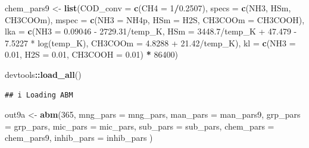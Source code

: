 \documentclass[
]{article}
\newenvironment{Shaded}{\begin{snugshade}}{\end{snugshade}}
\newcommand{\AttributeTok}[1]{\textcolor[rgb]{0.13,0.29,0.53}{#1}}
\newcommand{\DecValTok}[1]{\textcolor[rgb]{0.00,0.00,0.81}{#1}}
\newcommand{\FloatTok}[1]{\textcolor[rgb]{0.00,0.00,0.81}{#1}}
\newcommand{\FunctionTok}[1]{\textcolor[rgb]{0.13,0.29,0.53}{\textbf{#1}}}
\newcommand{\NormalTok}[1]{#1}
\newcommand{\OtherTok}[1]{\textcolor[rgb]{0.56,0.35,0.01}{#1}}
\newcommand{\SpecialCharTok}[1]{\textcolor[rgb]{0.81,0.36,0.00}{\textbf{#1}}}
\newcommand{\StringTok}[1]{\textcolor[rgb]{0.31,0.60,0.02}{#1}}
\begin{document}
\begin{Shaded}
\begin{Highlighting}[]
\NormalTok{chem\_pars9 }\OtherTok{\textless{}{-}} \FunctionTok{list}\NormalTok{(}\AttributeTok{COD\_conv =} \FunctionTok{c}\NormalTok{(}\AttributeTok{CH4 =} \DecValTok{1}\SpecialCharTok{/}\FloatTok{0.2507}\NormalTok{),}
                   \AttributeTok{specs =} \FunctionTok{c}\NormalTok{(}\StringTok{\textquotesingle{}NH3\textquotesingle{}}\NormalTok{, }\StringTok{\textquotesingle{}HSm\textquotesingle{}}\NormalTok{, }\StringTok{\textquotesingle{}CH3COOm\textquotesingle{}}\NormalTok{),}
                   \AttributeTok{mspec =} \FunctionTok{c}\NormalTok{(}\AttributeTok{NH3 =} \StringTok{\textquotesingle{}NH4p\textquotesingle{}}\NormalTok{, }\AttributeTok{HSm =} \StringTok{\textquotesingle{}H2S\textquotesingle{}}\NormalTok{, }\AttributeTok{CH3COOm =} \StringTok{\textquotesingle{}CH3COOH\textquotesingle{}}\NormalTok{),}
                   \AttributeTok{lka =} \FunctionTok{c}\NormalTok{(}\AttributeTok{NH3 =} \StringTok{\textquotesingle{}{-} 0.09046 {-} 2729.31/temp\_K\textquotesingle{}}\NormalTok{, }
                           \AttributeTok{HSm =} \StringTok{\textquotesingle{}{-} 3448.7/temp\_K + 47.479 {-} 7.5227 * log(temp\_K)\textquotesingle{}}\NormalTok{,}
                           \AttributeTok{CH3COOm =} \StringTok{\textquotesingle{}{-}4.8288 + 21.42/temp\_K\textquotesingle{}}\NormalTok{),}
                   \AttributeTok{kl =} \FunctionTok{c}\NormalTok{(}\AttributeTok{NH3 =} \FloatTok{0.01}\NormalTok{, }\AttributeTok{H2S =} \FloatTok{0.01}\NormalTok{, }\AttributeTok{CH3COOH =} \FloatTok{0.01}\NormalTok{) }\SpecialCharTok{*} \DecValTok{86400}\NormalTok{)}
\end{Highlighting}
\end{Shaded}

\begin{Shaded}
\begin{Highlighting}[]
\NormalTok{devtools}\SpecialCharTok{::}\FunctionTok{load\_all}\NormalTok{()}
\end{Highlighting}
\end{Shaded}

\begin{verbatim}
## i Loading ABM
\end{verbatim}

\begin{Shaded}
\begin{Highlighting}[]
\NormalTok{out9a }\OtherTok{\textless{}{-}} \FunctionTok{abm}\NormalTok{(}\DecValTok{365}\NormalTok{,}
             \AttributeTok{mng\_pars =}\NormalTok{ mng\_pars,}
             \AttributeTok{man\_pars =}\NormalTok{ man\_pars9,}
             \AttributeTok{grp\_pars =}\NormalTok{ grp\_pars,}
             \AttributeTok{mic\_pars =}\NormalTok{ mic\_pars,}
             \AttributeTok{sub\_pars =}\NormalTok{ sub\_pars,}
             \AttributeTok{chem\_pars =}\NormalTok{ chem\_pars9,}
             \AttributeTok{inhib\_pars =}\NormalTok{ inhib\_pars}
\NormalTok{)}
\end{Highlighting}
\end{Shaded}
\end{document}
